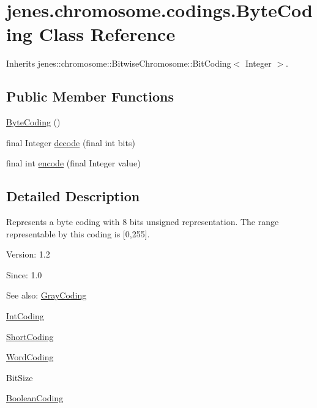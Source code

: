 \hypertarget{classjenes_1_1chromosome_1_1codings_1_1_byte_coding}{
\section{jenes.chromosome.codings.ByteCoding Class Reference}
\label{classjenes_1_1chromosome_1_1codings_1_1_byte_coding}
}
Inherits jenes::chromosome::BitwiseChromosome::BitCoding$<$ Integer $>$.

\subsection*{Public Member Functions}
\begin{CompactItemize}
\item 
\hyperlink{classjenes_1_1chromosome_1_1codings_1_1_byte_coding_e5e1d99eebeb9d81d5185808e319dc8a}{ByteCoding} ()
\item 
final Integer \hyperlink{classjenes_1_1chromosome_1_1codings_1_1_byte_coding_9cc6cb469c2fd907f50d9604fe6cb0fa}{decode} (final int bits)
\item 
final int \hyperlink{classjenes_1_1chromosome_1_1codings_1_1_byte_coding_1b6e6c0f7996c3d497b257c7417cc28d}{encode} (final Integer value)
\end{CompactItemize}


\subsection{Detailed Description}
Represents a byte coding with 8 bits unsigned representation. The range representable by this coding is \mbox{[}0,255\mbox{]}.

\begin{Desc}
\item[Version:]1.2 \end{Desc}
\begin{Desc}
\item[Since:]1.0\end{Desc}
\begin{Desc}
\item[See also:]\hyperlink{classjenes_1_1chromosome_1_1codings_1_1_gray_coding}{GrayCoding} 

\hyperlink{classjenes_1_1chromosome_1_1codings_1_1_int_coding}{IntCoding} 

\hyperlink{classjenes_1_1chromosome_1_1codings_1_1_short_coding}{ShortCoding} 

\hyperlink{classjenes_1_1chromosome_1_1codings_1_1_word_coding}{WordCoding} 

BitSize 

\hyperlink{classjenes_1_1chromosome_1_1codings_1_1_boolean_coding}{BooleanCoding} \end{Desc}



